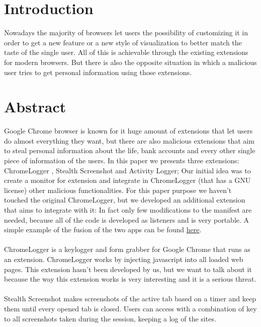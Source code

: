 \documentclass[12pt]{article}
\begin{document}
\begin{multicols}{2}
	\section*{Introduction}
	Nowadays the majority of browsers let users the possibility of customizing it in order to get a new feature or a new style of visualization to better match the taste of the single user.
	All of this is achievable through the existing extensions for modern browsers. But there is also the opposite situation in which a malicious user tries to get personal information using those extensions.
	
	\section*{Abstract}
	Google Chrome browser is known for it huge amount of extensions that let users do almost everything they want, but there are also malicious extensions that aim to steal personal information about the life, bank accounts and every other single piece of information of the users. In this paper we presents three extensions: ChromeLogger \cite{ChromeLogger}, Stealth Screenshot and Activity Logger;
	Our initial idea was to create a monitor for extension and integrate in ChromeLogger (that has a GNU license) other malicious functionalities. For this paper purpose we haven't touched the original ChromeLogger, but we developed an additional extension that aims to integrate with it: In  fact only few modifications to the manifest are needed, because all of the code is developed as listeners and is very portable. A simple example of the fusion of the two apps can be found \href{https://github.com/Trexy94/Fusion}{here}.
	\paragraph{}ChromeLogger is a keylogger and form grabber for Google Chrome that runs as an extension.	
	ChromeLogger works by injecting javascript into all loaded web pages. This extension hasn't been developed by us, but we want to talk about it because the way this extension works is very interesting and it is a serious threat.
	\paragraph{}Stealth Screenshot makes screenshots of the active tab based on a timer and keep them until every opened tab is closed. Users can access with a combination of key to all screenshots taken during the session, keeping a log of the sites.

\end{multicols}
\end{document}
